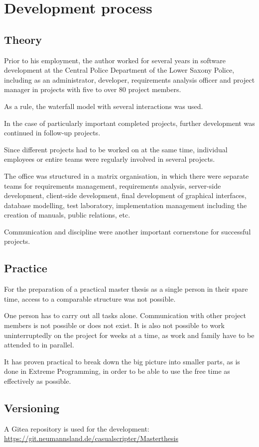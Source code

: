 \chapter{Development process}
\label{chap:devproc}

\section{Theory}

Prior to his employment, the author worked for several years in software development at the Central Police Department of the Lower Saxony Police, including as an administrator, developer, requirements analysis officer and project manager in projects with five to over 80 project members.

As a rule, the waterfall model with several interactions was used.

In the case of particularly important completed projects, further development was continued in follow-up projects.

Since different projects had to be worked on at the same time, individual employees or entire teams were regularly involved in several projects.

The office was structured in a matrix organisation, in which there were separate teams for requirements management, requirements analysis, server-side development, client-side development, final development of graphical interfaces, database modelling, test laboratory, implementation management including the creation of manuals, public relations, etc.

Communication and discipline were another important cornerstone for successful projects.

\section{Practice}

For the preparation of a practical master thesis as a single person in their spare time, access to a comparable structure was not possible.

One person has to carry out all tasks alone. Communication with other project members is not possible or does not exist. It is also not possible to work uninterruptedly on the project for weeks at a time, as work and family have to be attended to in parallel.

It has proven practical to break down the big picture into smaller parts, as is done in Extreme Programming, in order to be able to use the free time as effectively as possible.

\section{Versioning}

A Gitea repository is used for the development: \url{https://git.neumannsland.de/casualscripter/Masterthesis}